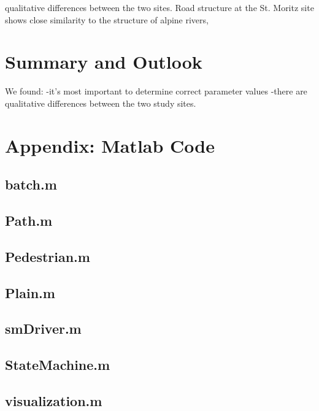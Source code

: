 \documentclass[a4paper, DIV11, abstracton]{scrartcl}
\begin{document}
qualitative differences between the two sites. Road structure at the St. Moritz site shows close similarity to the structure of alpine rivers, 




\section{Summary and Outlook}
We found:
-it's most important to determine correct parameter values
-there are qualitative differences between the two study sites.

%
%

\renewcommand{\refname}{\section{References}} %




\newpage
\section{Appendix: Matlab Code}
\subsection*{batch.m}

\subsection*{Path.m}

\subsection*{Pedestrian.m}

\subsection*{Plain.m}

\subsection*{smDriver.m}

\subsection*{StateMachine.m}

\subsection*{visualization.m}

\end{document}
